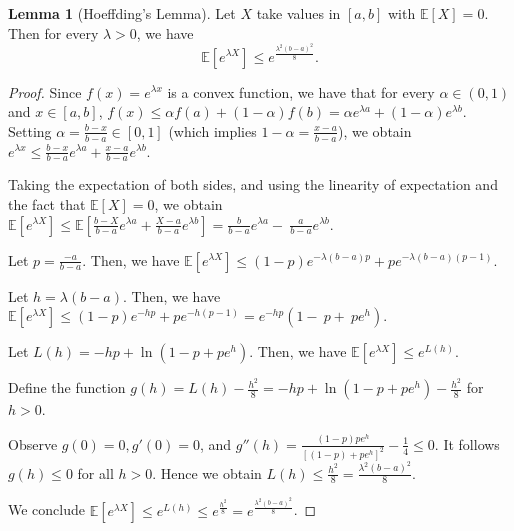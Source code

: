 \documentclass[openany, amssymb, psamsfonts]{amsart}
\theoremstyle{definition}
\numberwithin{equation}{section}
\newtheorem{appendixlemma}{Lemma}
\begin{document}
\begin{appendixlemma}[Hoeffding's Lemma]\label{appendix lemma: hoeffding's lemma}
Let $X$ take values in $[a,b]$ with $\mathbb{E}[X]=0$. Then for every $\lambda>0$, we have
\[
\mathbb{E}[e^{\lambda X}] \le e^{\tfrac{\lambda^2(b-a)^2}{8}}.
\]
\end{appendixlemma}

\begin{proof}
Since $f(x) = e^{\lambda x}$ is a convex function, we have that for every $\alpha \in (0, 1)$ and $x \in [a, b]$,  
$f(x) \leq \alpha f(a) + (1 - \alpha) f(b) = \alpha e^{\lambda a} + (1 - \alpha) e^{\lambda b}$.  
Setting $\alpha = \tfrac{b - x}{b - a} \in [0, 1]$ (which implies $1 - \alpha = \tfrac{x - a}{b - a}$), we obtain
$e^{\lambda x} \leq \tfrac{b - x}{b - a} e^{\lambda a} + \tfrac{x - a}{b - a} e^{\lambda b}$.  

Taking the expectation of both sides, and using the linearity of expectation and the fact that $\mathbb{E}[X] = 0$, we obtain $\mathbb{E}[e^{\lambda X}] \leq \mathbb{E}\!\left[ \tfrac{b - X}{b - a} e^{\lambda a} + \tfrac{X - a}{b - a} e^{\lambda b} \right] 
= \tfrac{b}{b - a} e^{\lambda a} - ~\tfrac{a}{b - a} e^{\lambda b}$.

Let $p = \tfrac{-a}{b - a}$. Then, we have
$\mathbb{E}[e^{\lambda X}] \leq (1-p) e^{- \lambda (b-a)p} + p e^{- \lambda (b-a)(p-1)}$.

Let $h = \lambda (b - a)$. Then, we have $\mathbb{E}[e^{\lambda X}] \leq (1-p) e^{-hp} + p e^{-h(p-1)} = e^{-hp}(1-~p+~pe^{h})$.

Let $L(h) = -h p + \ln(1 - p + p e^{h})$. Then, we have
$\mathbb{E}[e^{\lambda X}] \leq e^{L(h)}$.

Define the function $g(h) = L(h) - \tfrac{h^2}{8} = -hp + \ln(1 - p + pe^h) - \tfrac{h^2}{8}$ for $h > 0$.

Observe $g(0) = 0, g'(0) = 0$, and $g''(h) = \tfrac{(1-p)pe^h}{[(1-p) + pe^h]^2} - \tfrac{1}{4} \leq 0$.  
It follows $g(h) \leq 0$ for all $h > 0$. Hence we obtain $L(h) \leq \tfrac{h^2}{8} = \tfrac{\lambda^2 (b - a)^2}{8}$.

We conclude $\mathbb{E}[e^{\lambda X}] \leq e^{L(h)} \leq e^{\tfrac{h^2}{8}} = e^{\tfrac{\lambda^2 (b - a)^2}{8}}$.
\end{proof}
\end{document}

